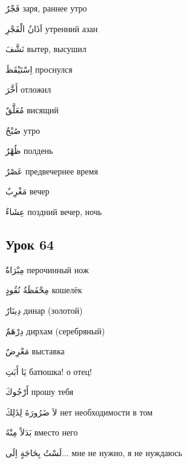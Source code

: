 \documentclass[a5paper]{article}
\newcommand\textstyleDropCaps[1]{#1}
\newcommand\textstyleCaptioncharacters[1]{#1}
\begin{document}
\textstyleCaptioncharacters{فَجْرٌ }\textstyleDropCaps{заря, раннее утро‎}

\textstyleCaptioncharacters{اَذَانُ الْفَجْرِ }\textstyleDropCaps{утренний азан‎}

\textstyleCaptioncharacters{نَشَّفَ }\textstyleDropCaps{вытер, высушил‎}

\textstyleCaptioncharacters{اِسْتَيْقَظَ }\textstyleDropCaps{проснулся‎}

\textstyleCaptioncharacters{أَخَّرَ }\textstyleDropCaps{отложил‎}

\textstyleCaptioncharacters{مُعَلَّقٌ }\textstyleDropCaps{висящий‎}

\textstyleCaptioncharacters{صُبْحٌ }\textstyleDropCaps{утро‎}

\textstyleCaptioncharacters{ظُهْرٌ }\textstyleDropCaps{полдень‎}

\textstyleCaptioncharacters{عَصْرٌ }\textstyleDropCaps{предвечернее время‎}

\textstyleCaptioncharacters{مَغْرِبٌ }\textstyleDropCaps{вечер‎}

\textstyleCaptioncharacters{عِشَاءٌ }\textstyleDropCaps{поздний вечер, ночь‎}

\subsection[Урок 64‎]{\textstyleDropCaps{Урок 64‎}}
\textstyleCaptioncharacters{مِبْرَاةٌ }\textstyleDropCaps{перочинный нож‎}

\textstyleCaptioncharacters{مِحْفَظَةُ نُقُودٍ }\textstyleDropCaps{кошелёк‎}

\textstyleCaptioncharacters{دِينَارٌ }\textstyleDropCaps{динар (золотой)‎}

\textstyleCaptioncharacters{دِرْهَمٌ }\textstyleDropCaps{дирхам (серебря­ный)‎}

\textstyleCaptioncharacters{مَعْرِضٌ }\textstyleDropCaps{выставка‎}

\textstyleCaptioncharacters{يَا أَبَتِ }\textstyleDropCaps{батюшка! о отец!‎}

\textstyleCaptioncharacters{أَرْجُوكَ }\textstyleDropCaps{прошу тебя‎}

\textstyleCaptioncharacters{لاَ ضَرُورَةَ لِذَلِكَ }\textstyleDropCaps{нет необходимости в том‎}

\textstyleCaptioncharacters{بَدَلاً مِنْهُ }\textstyleDropCaps{вместо него‎}

\textstyleCaptioncharacters{لَسْتُ بِحَاجَةٍ اِلَى...ِ }\textstyleDropCaps{мне не нужно, я не нуждаюсь‎}
\end{document}
